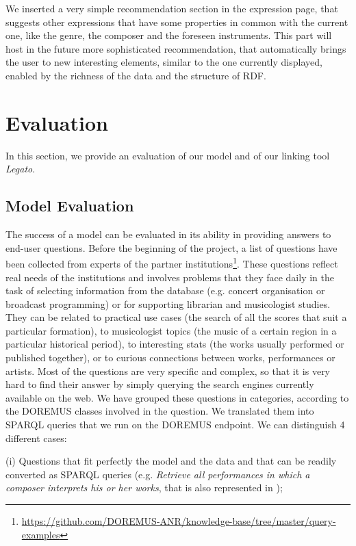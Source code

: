 We inserted a very simple recommendation section in the expression page, that suggests other expressions that have some properties in common with the current one, like the genre, the composer and the foreseen instruments. This part will host in the future more sophisticated recommendation, that automatically brings the user to new interesting elements, similar to the one currently displayed, enabled by the richness of the data and the structure of RDF.


\section{Evaluation}
\label{sec:evaluation}
In this section, we provide an evaluation of our model and of our linking tool {\it Legato}.

\subsection{Model Evaluation}
The success of a model can be evaluated in its ability in providing answers to end-user questions. Before the beginning of the project, a list of questions have been collected from experts of the partner institutions\footnote{\url{https://github.com/DOREMUS-ANR/knowledge-base/tree/master/query-examples}}. These questions reflect real needs of the institutions and involves problems that they face daily in the task of selecting information from the database (e.g. concert organisation or broadcast programming) or for supporting librarian and musicologist studies. They can be related to practical use cases (the search of all the scores that suit a particular formation), to musicologist topics (the music of a certain region in a particular historical period), to interesting stats (the works usually performed or published together), or to curious connections between works, performances or artists. Most of the questions are very specific and complex, so that it is very hard to find their answer by simply querying the search engines currently available on the web. We have grouped these questions in categories, according to the DOREMUS classes involved in the question. We translated them into SPARQL queries that we run on the DOREMUS endpoint. We can distinguish 4 different cases:

(i) Questions that fit perfectly the model and the data and that can be readily converted as SPARQL queries (e.g. \textit{Retrieve all performances in which a composer interprets his or her works}, that is also represented in );

